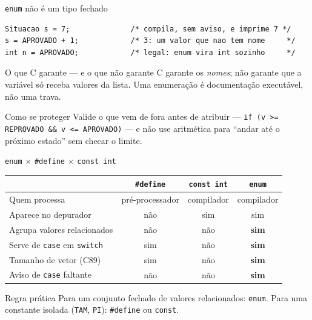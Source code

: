 \documentclass[aspectratio=169]{beamer}
\begin{document}
\begin{frame}[fragile]{\texttt{enum} não é um tipo fechado}
\begin{lstlisting}[basicstyle=\ttfamily\scriptsize]
Situacao s = 7;              /* compila, sem aviso, e imprime 7 */
s = APROVADO + 1;            /* 3: um valor que nao tem nome     */
int n = APROVADO;            /* legal: enum vira int sozinho     */
\end{lstlisting}
  \begin{alertblock}{O que C garante --- e o que não garante}
    C garante os \emph{nomes}; não garante que a variável só receba valores da
    lista. Uma enumeração é documentação executável, não uma trava.
  \end{alertblock}
  \begin{block}{Como se proteger}
    Valide o que vem de fora antes de atribuir --- \texttt{if (v >= REPROVADO
    \&\& v <= APROVADO)} --- e não use aritmética para ``andar até o próximo
    estado'' sem checar o limite.
  \end{block}
\end{frame}

\begin{frame}[fragile]{\texttt{enum} $\times$ \texttt{\#define} $\times$ \texttt{const int}}
  \begin{center}
  \small
  \begin{tabular}{lccc}
    \toprule
     & \texttt{\#define} & \texttt{const int} & \texttt{enum} \\
    \midrule
    Quem processa & pré-processador & compilador & compilador \\
    Aparece no depurador & não & sim & sim \\
    Agrupa valores relacionados & não & não & \textbf{sim} \\
    Serve de \texttt{case} em \texttt{switch} & sim & não & \textbf{sim} \\
    Tamanho de vetor (C89) & sim & não & \textbf{sim} \\
    Aviso de \texttt{case} faltante & não & não & \textbf{sim} \\
    \bottomrule
  \end{tabular}
  \end{center}
  \begin{block}{Regra prática}
    Para um conjunto fechado de valores relacionados: \texttt{enum}.
    Para uma constante isolada (\texttt{TAM}, \texttt{PI}): \texttt{\#define}
    ou \texttt{const}.
  \end{block}
\end{frame}
\end{document}
